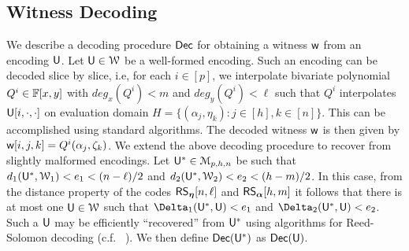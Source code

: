 \subsection{Witness Decoding}\label{sec:witdecoding}
We describe a decoding procedure $\mathsf{Dec}$ for obtaining a witness $\mathsf{w}$ from an encoding $\mathsf{U}$. Let $\mathsf{U}\in \mathcal{W}$ be a well-formed encoding. Such an encoding can be decoded slice by slice, i.e, for each $i\in [p]$, we interpolate bivariate polynomial $Q^i\in \mathbb{F}[x,y]$ with $deg_x(Q^i)<m$ and $deg_y(Q^i)<\ell$ such that $Q^i$ interpolates $\mathsf{U}[i,\cdot,\cdot]$ on evaluation domain $H=\{(\alpha_j,\eta_k): j\in [h], k\in [n]\}$. This can be accomplished using standard algorithms. The decoded witness $\mathsf{w}$ is then given by $\mathsf{w}[i,j,k]=Q^i(\alpha_j,\zeta_k)$. We extend the above decoding procedure to recover from slightly malformed encodings. Let $\mathsf{U}^*\in \mathcal{M}_{p,h,n}$ be such that $d_1(\mathsf{U}^*,\mathcal{W}_1)<e_1 <(n-\ell)/2 $ and $d_2(\mathsf{U}^*,\mathcal{W}_2)<e_2 <(h-m)/2$. In this case, from the distance property of the codes $\mathsf{RS}_{\bm{\eta}}[n,\ell]$ and $\mathsf{RS}_{\bm{\alpha}}[h,m]$ it follows that there is at most one $\mathsf{U}\in \mathcal{W}$ such that $\Delta_1(\ewit^*,\ewit)<e_1$ and $\Delta_2(\ewit^*,\ewit)<e_2$. Such a $\mathsf{U}$ may be efficiently ``recovered'' from $\mathsf{U}^*$ using algorithms for Reed-Solomon decoding (c.f. ~\cite{CodingTheory}). We then define $\mathsf{Dec}(\mathsf{U}^*)$ as $\mathsf{Dec}(\mathsf{U})$. 
